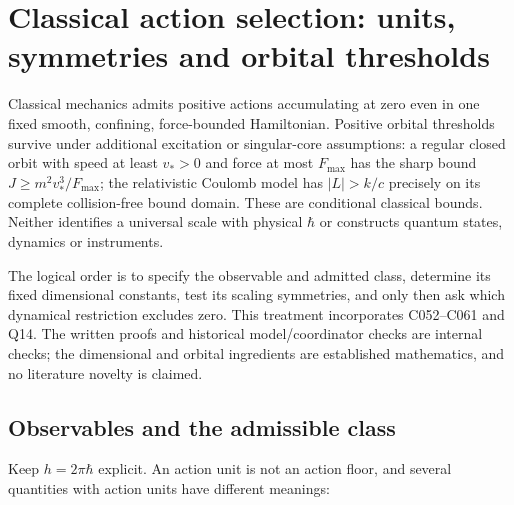 \documentclass[11pt,a4paper]{article}
\begin{document}
\hypertarget{classical-action-selection-units-symmetries-and-orbital-thresholds}{%
\section{Classical action selection: units, symmetries and orbital
thresholds}\label{classical-action-selection-units-symmetries-and-orbital-thresholds}}

Classical mechanics admits positive actions accumulating at zero even in
one fixed smooth, confining, force-bounded Hamiltonian. Positive orbital
thresholds survive under additional excitation or singular-core
assumptions: a regular closed orbit with speed at least \(v_*>0\) and
force at most \(F_{\max}\) has the sharp bound
\(J\ge m^2v_*^3/F_{\max}\); the relativistic Coulomb model has
\(|L|>k/c\) precisely on its complete collision-free bound domain. These
are conditional classical bounds. Neither identifies a universal scale
with physical \(\hbar\) or constructs quantum states, dynamics or
instruments.

The logical order is to specify the observable and admitted class,
determine its fixed dimensional constants, test its scaling symmetries,
and only then ask which dynamical restriction excludes zero. This
treatment incorporates C052--C061 and Q14. The written proofs and
historical model/coordinator checks are internal checks; the dimensional
and orbital ingredients are established mathematics, and no literature
novelty is claimed.

\hypertarget{observables-and-the-admissible-class}{%
\subsection{Observables and the admissible
class}\label{observables-and-the-admissible-class}}

Keep \(h=2\pi\hbar\) explicit. An action unit is not an action floor,
and several quantities with action units have different meanings:
\end{document}
